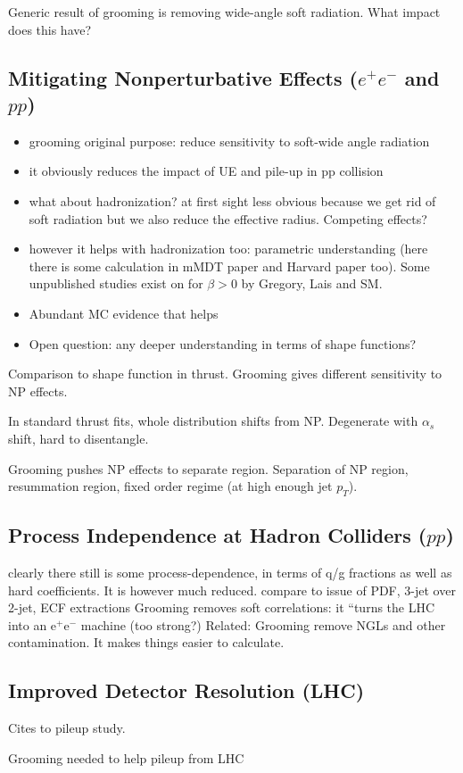 

Generic result of grooming is removing wide-angle soft radiation.  What impact does this have?

\subsection{Mitigating Nonperturbative Effects ($e^+e^-$ and $pp$)}


\begin{itemize}
\item grooming original purpose: reduce sensitivity to soft-wide angle radiation
\item it obviously reduces the impact of UE and pile-up in pp collision
\item what about hadronization? at first sight less obvious because we get rid of soft radiation but we also reduce the effective radius. Competing effects?
\item however it helps with hadronization too: parametric understanding (here there is some calculation in mMDT paper and Harvard paper too). Some unpublished studies exist on  for $\beta>0$ by Gregory, Lais and SM. 
\item Abundant MC evidence that helps
\item Open question: any deeper understanding in terms of shape functions?
\end{itemize}

Comparison to shape function in thrust.  Grooming gives different sensitivity to NP effects.

In standard thrust fits, whole distribution shifts from NP.  Degenerate with $\alpha_s$ shift, hard to disentangle.

Grooming pushes NP effects to separate region.  Separation of NP region, resummation region, fixed order regime (at high enough jet $p_T$).

\subsection{Process Independence at Hadron Colliders ($pp$)}

clearly there still is some process-dependence, in terms of q/g fractions as well as hard coefficients. It is however much reduced.
compare to issue of PDF, 3-jet over 2-jet, ECF extractions
Grooming removes soft correlations: it ``turns the LHC into an e$^+$e$^-$ machine (too strong?)
Related:  Grooming remove NGLs and other contamination. It makes things easier to calculate. 


\subsection{Improved Detector Resolution (LHC)}

Cites to pileup study.

Grooming needed to help pileup from LHC
